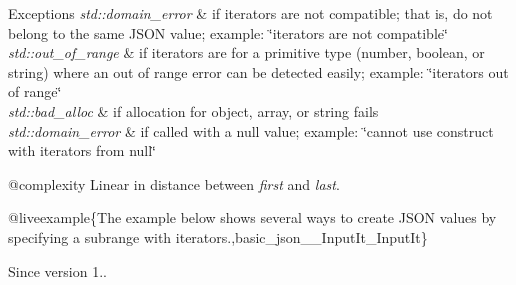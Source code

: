 \begin{DoxyExceptions}{Exceptions}
{\em std\+::domain\+\_\+error} & if iterators are not compatible; that is, do not belong to the same J\+S\+ON value; example\+: {\ttfamily \char`\"{}iterators are not compatible\char`\"{}} \\
\hline
{\em std\+::out\+\_\+of\+\_\+range} & if iterators are for a primitive type (number, boolean, or string) where an out of range error can be detected easily; example\+: {\ttfamily \char`\"{}iterators out of range\char`\"{}} \\
\hline
{\em std\+::bad\+\_\+alloc} & if allocation for object, array, or string fails \\
\hline
{\em std\+::domain\+\_\+error} & if called with a null value; example\+: {\ttfamily \char`\"{}cannot
use construct with iterators from null\char`\"{}}\\
\hline
\end{DoxyExceptions}
@complexity Linear in distance between {\itshape first} and {\itshape last}.

@liveexample\{The example below shows several ways to create J\+S\+ON values by specifying a subrange with iterators.,basic\+\_\+json\+\_\+\+\_\+\+Input\+It\+\_\+\+Input\+It\}

\begin{DoxySince}{Since}
version 1.. 
\end{DoxySince}
\mbox{\label{classnlohmann_1_1basic__json_a757e90574a742ae9cc54c97422fb3043}} 
